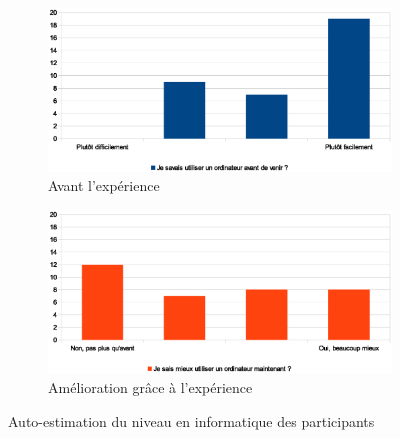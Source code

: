\begin{figure}
  \begin{center}
    \begin{subfigure}[b]{\textwidth}
      \includegraphics[width=\textwidth]{content/8-validation/images/ordi-avant}
      \caption{Avant l'expérience}
    \end{subfigure}
    \begin{subfigure}[b]{\textwidth}
      \includegraphics[width=\textwidth]{content/8-validation/images/ordi-apres}
      \caption{Amélioration grâce à l'expérience}
    \end{subfigure}
    \caption{Auto-estimation du niveau en informatique des participants}
    \label{fig:niveau-info}
  \end{center}
\end{figure}
